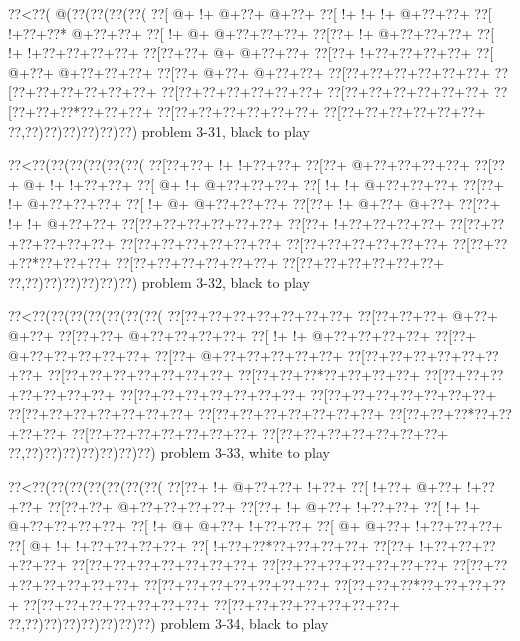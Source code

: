 \vbox{\vbox{\goo
\0??<\0??(\- @(\0??(\0??(\0??(\0??(
\0??[\- @+\- !+\- @+\0??+\- @+\0??+
\0??[\- !+\- !+\- !+\- @+\0??+\0??+
\0??[\- !+\0??+\0??*\- @+\0??+\0??+
\0??[\- !+\- @+\- @+\0??+\0??+\0??+
\0??[\0??+\- !+\- @+\0??+\0??+\0??+
\0??[\- !+\- !+\0??+\0??+\0??+\0??+
\0??[\0??+\0??+\- @+\- @+\0??+\0??+
\0??[\0??+\- !+\0??+\0??+\0??+\0??+
\0??[\- @+\0??+\- @+\0??+\0??+\0??+
\0??[\0??+\- @+\0??+\- @+\0??+\0??+
\0??[\0??+\0??+\0??+\0??+\0??+\0??+
\0??[\0??+\0??+\0??+\0??+\0??+\0??+
\0??[\0??+\0??+\0??+\0??+\0??+\0??+
\0??[\0??+\0??+\0??+\0??+\0??+\0??+
\0??[\0??+\0??+\0??*\0??+\0??+\0??+
\0??[\0??+\0??+\0??+\0??+\0??+\0??+
\0??[\0??+\0??+\0??+\0??+\0??+\0??+
\0??,\0??)\0??)\0??)\0??)\0??)\0??)
}
\hfil problem 3-31, black to play\hfil\break
}

\vbox{\vbox{\goo
\0??<\0??(\0??(\0??(\0??(\0??(\0??(
\0??[\0??+\0??+\- !+\- !+\0??+\0??+
\0??[\0??+\- @+\0??+\0??+\0??+\0??+
\0??[\0??+\- @+\- !+\- !+\0??+\0??+
\0??[\- @+\- !+\- @+\0??+\0??+\0??+
\0??[\- !+\- !+\- @+\0??+\0??+\0??+
\0??[\0??+\- !+\- @+\0??+\0??+\0??+
\0??[\- !+\- @+\- @+\0??+\0??+\0??+
\0??[\0??+\- !+\- @+\0??+\- @+\0??+
\0??[\0??+\- !+\- !+\- @+\0??+\0??+
\0??[\0??+\0??+\0??+\0??+\0??+\0??+
\0??[\0??+\- !+\0??+\0??+\0??+\0??+
\0??[\0??+\0??+\0??+\0??+\0??+\0??+
\0??[\0??+\0??+\0??+\0??+\0??+\0??+
\0??[\0??+\0??+\0??+\0??+\0??+\0??+
\0??[\0??+\0??+\0??*\0??+\0??+\0??+
\0??[\0??+\0??+\0??+\0??+\0??+\0??+
\0??[\0??+\0??+\0??+\0??+\0??+\0??+
\0??,\0??)\0??)\0??)\0??)\0??)\0??)
}
\hfil problem 3-32, black to play\hfil\break
}

\vbox{\vbox{\goo
\0??<\0??(\0??(\0??(\0??(\0??(\0??(\0??(
\0??[\0??+\0??+\0??+\0??+\0??+\0??+\0??+
\0??[\0??+\0??+\0??+\- @+\0??+\- @+\0??+
\0??[\0??+\0??+\- @+\0??+\0??+\0??+\0??+
\0??[\- !+\- !+\- @+\0??+\0??+\0??+\0??+
\0??[\0??+\- @+\0??+\0??+\0??+\0??+\0??+
\0??[\0??+\- @+\0??+\0??+\0??+\0??+\0??+
\0??[\0??+\0??+\0??+\0??+\0??+\0??+\0??+
\0??[\0??+\0??+\0??+\0??+\0??+\0??+\0??+
\0??[\0??+\0??+\0??*\0??+\0??+\0??+\0??+
\0??[\0??+\0??+\0??+\0??+\0??+\0??+\0??+
\0??[\0??+\0??+\0??+\0??+\0??+\0??+\0??+
\0??[\0??+\0??+\0??+\0??+\0??+\0??+\0??+
\0??[\0??+\0??+\0??+\0??+\0??+\0??+\0??+
\0??[\0??+\0??+\0??+\0??+\0??+\0??+\0??+
\0??[\0??+\0??+\0??*\0??+\0??+\0??+\0??+
\0??[\0??+\0??+\0??+\0??+\0??+\0??+\0??+
\0??[\0??+\0??+\0??+\0??+\0??+\0??+\0??+
\0??,\0??)\0??)\0??)\0??)\0??)\0??)\0??)
}
\hfil problem 3-33, white to play\hfil\break
}

\vbox{\vbox{\goo
\0??<\0??(\0??(\0??(\0??(\0??(\0??(\0??(
\0??[\0??+\- !+\- @+\0??+\0??+\- !+\0??+
\0??[\- !+\0??+\- @+\0??+\- !+\0??+\0??+
\0??[\0??+\0??+\- @+\0??+\0??+\0??+\0??+
\0??[\0??+\- !+\- @+\0??+\- !+\0??+\0??+
\0??[\- !+\- !+\- @+\0??+\0??+\0??+\0??+
\0??[\- !+\- @+\- @+\0??+\- !+\0??+\0??+
\0??[\- @+\- @+\0??+\- !+\0??+\0??+\0??+
\0??[\- @+\- !+\- !+\0??+\0??+\0??+\0??+
\0??[\- !+\0??+\0??*\0??+\0??+\0??+\0??+
\0??[\0??+\- !+\0??+\0??+\0??+\0??+\0??+
\0??[\0??+\0??+\0??+\0??+\0??+\0??+\0??+
\0??[\0??+\0??+\0??+\0??+\0??+\0??+\0??+
\0??[\0??+\0??+\0??+\0??+\0??+\0??+\0??+
\0??[\0??+\0??+\0??+\0??+\0??+\0??+\0??+
\0??[\0??+\0??+\0??*\0??+\0??+\0??+\0??+
\0??[\0??+\0??+\0??+\0??+\0??+\0??+\0??+
\0??[\0??+\0??+\0??+\0??+\0??+\0??+\0??+
\0??,\0??)\0??)\0??)\0??)\0??)\0??)\0??)
}
\hfil problem 3-34, black to play\hfil\break
}

